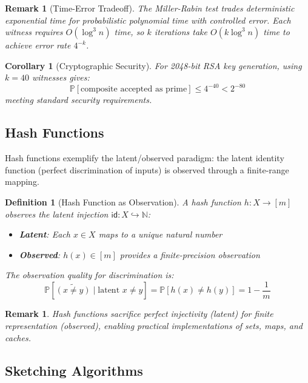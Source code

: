 \documentclass[11pt,final,hidelinks]{article}
\newtheorem{corollary}[theorem]{Corollary}
\newtheorem{definition}[theorem]{Definition}
\newtheorem{remark}[theorem]{Remark}
\newcommand{\obs}[1]{\widetilde{#1}}  %
\newcommand{\Prob}[1]{\mathbb{P}\left[#1\right]}
\newcommand{\ProbCond}[2]{\mathbb{P}\left[#1 \mid #2\right]}
\begin{document}
\begin{remark}[Time-Error Tradeoff]
The Miller-Rabin test trades deterministic exponential time for probabilistic polynomial time with controlled error. Each witness requires $O(\log^3 n)$ time, so $k$ iterations take $O(k \log^3 n)$ time to achieve error rate $4^{-k}$.
\end{remark}

\begin{corollary}[Cryptographic Security]
For 2048-bit RSA key generation, using $k = 40$ witnesses gives:
\begin{equation}
\Prob{\text{composite accepted as prime}} \leq 4^{-40} < 2^{-80}
\end{equation}
meeting standard security requirements.
\end{corollary}

\subsection{Hash Functions}

Hash functions exemplify the latent/observed paradigm: the latent identity function (perfect discrimination of inputs) is observed through a finite-range mapping.

\begin{definition}[Hash Function as Observation]
A hash function $h : X \to [m]$ observes the latent injection $\mathsf{id} : X \hookrightarrow \mathbb{N}$:
\begin{itemize}
    \item \textbf{Latent}: Each $x \in X$ maps to a unique natural number
    \item \textbf{Observed}: $h(x) \in [m]$ provides a finite-precision observation
\end{itemize}
The observation quality for discrimination is:
\begin{equation}
\ProbCond{\obs{(x \neq y)}}{\text{latent } x \neq y} = \Prob{h(x) \neq h(y)} = 1 - \frac{1}{m}
\end{equation}
\end{definition}

\begin{remark}
Hash functions sacrifice perfect injectivity (latent) for finite representation (observed), enabling practical implementations of sets, maps, and caches.
\end{remark}

\subsection{Sketching Algorithms}
\end{document}
